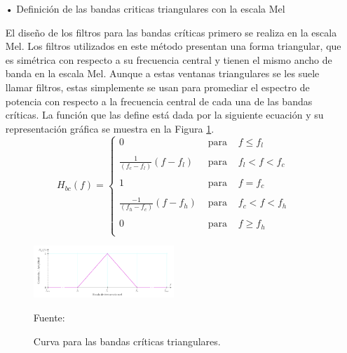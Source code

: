 \begin{enumerate}
\begin{enumerate}
\newpage
\item[•]Definición de las bandas criticas triangulares con la escala Mel
\par
El diseño de los filtros para las bandas críticas primero se realiza en la escala Mel. Los filtros utilizados en este método presentan una forma triangular, que es simétrica con respecto a su frecuencia central y tienen el mismo ancho de banda en la escala Mel.
\vskip 0.5cm
Aunque a estas ventanas triangulares se les suele llamar filtros, estas simplemente se usan para promediar el espectro de potencia con respecto a la frecuencia central de cada una de las bandas críticas. La función que las define está dada por la siguiente ecuación y su representación gráfica se muestra en la Figura \ref{fig:figura2.41}.
\begin{equation}
\label{eq:ecuacion49}
H_{bc}(f)= \left\{ \begin{array}{lcl}
0 & \mbox{ para } & f \leq f_{l} \\
& & \\
\frac{1}{(f_{c} - f_{l})}(f - f_{l}) & \mbox{ para } & f_{l} < f < f_{c} \\
& & \\
1 & \mbox{ para } & f = f_{c} \\
& & \\
\frac{- 1}{(f_{h} - f_{c})}(f - f_{h}) & \mbox{ para } & f_{c} < f < f_{h} \\
& & \\
0 & \mbox{ para } & f \geq f_{h} \\
\end{array}
\right.
\end{equation}

\begin{figure}[H]
\begin{center}
\includegraphics[width=0.5\textwidth]{Imagenes/Cap2/image042}
\end{center}
\begin{center}
\vskip -0.5cm
\caption{\small{Curva para las bandas críticas triangulares.}}
\label{fig:figura2.41}
{\small{Fuente: \cite{eyra}}}
\end{center}
\end{figure}


\end{enumerate}
\end{enumerate}
